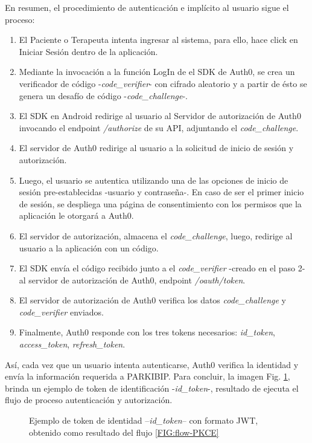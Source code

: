 En resumen, el procedimiento de autenticación e implícito al usuario sigue el proceso:
\begin{enumerate}
    \item El Paciente o Terapeuta intenta ingresar al sistema, para ello, hace click en Iniciar Sesión dentro de la aplicación.
    \item Mediante la invocación a la función LogIn de el SDK de Auth0, se crea un verificador de código -\textit{code\_verifier}- con cifrado aleatorio y a partir de ésto se genera un desafío de código -\textit{code\_challenge}-.
    \item El SDK en Android redirige al usuario al Servidor de autorización de Auth0 invocando el endpoint \textit{/authorize} de su API, adjuntando el \textit{code\_challenge}.
    \item El servidor de Auth0 redirige al usuario a la solicitud de inicio de sesión y autorización.
    \item Luego, el usuario se autentica utilizando una de las opciones de inicio de sesión pre-establecidas -usuario y contraseña-. En caso de ser el primer inicio de sesión, se despliega una página de consentimiento con los permisos que la aplicación le otorgará a Auth0.
    \item El servidor de autorización, almacena el \textit{code\_challenge}, luego, redirige al usuario a la aplicación con un código.
    \item El SDK envía el código recibido junto a el \textit{code\_verifier} -creado en el paso 2- al servidor de autorización de Auth0, endpoint \textit{/oauth/token}.
    \item El servidor de  autorización de Auth0 verifica los datos  \textit{code\_challenge} y \textit{code\_verifier} enviados.
    \item Finalmente, Auth0 responde con los tres tokens necesarios: \textit{id\_token}, \textit{access\_token}, \textit{refresh\_token}.
\end{enumerate}

Así, cada vez que un usuario intenta autenticarse, Auth0 verifica la identidad y envía la información requerida a PARKIBIP. Para concluir, la imagen Fig. \ref{FIG:idtoken}, brinda un ejemplo de token de identificación -\textit{id\_token}-, resultado de ejecuta el flujo de proceso autenticación y autorización.

\begin{figure}[!h]
\caption{Ejemplo de token de identidad --\textit{id\_token}-- con formato JWT, obtenido como resultado del flujo \ref{FIG:flow-PKCE} }
\label{FIG:idtoken}
\end{figure}

